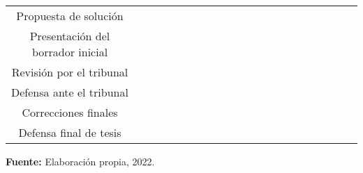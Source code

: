 \begin{chart}
\begin{threeparttable}
\begin{tabulary}{1.0\textwidth}{|c|c|c|c|c|c|c|c|c|c|c|c|c|c|c|c|c|c|c|c|c|}
                 & {} & {} & {} & {} 
                 & {} & {} & {} & {} 
                 & {} & {} & {} & {} 
                 & {} & {} & {} & {} \\
            \hline
                {Propuesta de soluci\'{o}n}
                 & {} & {} & {} & {} 
                 & {} & {} & {} & {} 
                 & {} & {} & {} & {} 
                 & {} & {} & {} & {} 
                 & {} & {} & {} & {} \\
            \hline
                {Presentaci\'{o}n del borrador inicial}
                 & {} & {} & {} & {} 
                 & {} & {} & {} & {} 
                 & {} & {} & {} & {} 
                 & {} & {} & {} & {} 
                 & {} & {} & {} & {} \\
            \hline
                {Revisi\'{o}n por el tribunal}
                 & {} & {} & {} & {} 
                 & {} & {} & {} & {} 
                 & {} & {} & {} & {} 
                 & {} & {} & {} & {} 
                 & {} & {} & {} & {} \\
            \hline
                {Defensa ante el tribunal}
                 & {} & {} & {} & {} 
                 & {} & {} & {} & {} 
                 & {} & {} & {} & {} 
                 & {} & {} & {} & {} 
                 & {} & {} & {} & {} \\
            \hline
                {Correcciones finales}
                 & {} & {} & {} & {} 
                 & {} & {} & {} & {} 
                 & {} & {} & {} & {} 
                 & {} & {} & {} & {} 
                 & {} & {} & {} & {} \\
            \hline
                {Defensa final de tesis}
                 & {} & {} & {} & {} 
                 & {} & {} & {} & {} 
                 & {} & {} & {} & {} 
                 & {} & {} & {} & {} 
                 & {} & {} & {} & {} \\
            \hline
        \end{tabulary}
        \begin{tablenotes}
            \small\item \textbf{Fuente:} Elaboraci\'{o}n propia, 2022.
        \end{tablenotes}
    \end{threeparttable}
\end{chart}

